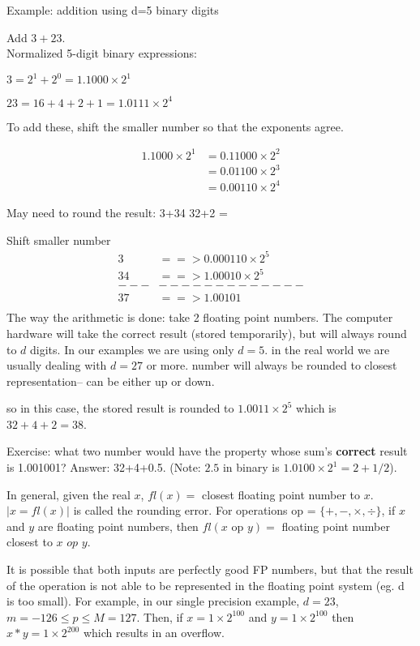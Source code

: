 Example: addition using d=5 binary digits

Add $3+23$.\\ \noi
Normalized 5-digit binary expressions:

$3 = 2^1 + 2^0 = 1.1000 \times 2^1$

$23 = 16 + 4 + 2 + 1 = 1.0111 \times 2^4$

To add these, shift the smaller number so that the exponents agree.

\begin{align}
1.1000 \times 2^1 & = 0.11000 \times 2^2 \\
& = 0.01100 \times 2^3 \\
& = 0.00110 \times 2^4
\end{align}



May need to round the result: 
3+34
32+2 = 

Shift smaller number
\begin{align*}
3 &==> 0.000110 \times 2^5\\
34 &==> 1.00010 \times 2^5\\
---&-------------\\
37 &==> 1.00101  \\
\end{align*}
\noi
The way the arithmetic is done: take 2 floating point numbers. The computer
hardware will take the correct result (stored temporarily), but will always
round to $d$ digits. In our examples we are using only $d=5$. in the real world we are usually dealing with $d=27$ or more. number will always be rounded to closest representation-- can be either up or down. 

so in this case, the stored result is rounded to $1.0011 \times 2^5$ which is $32+4+2 = 38$. 

Exercise: what two number would have the property whose sum's \textbf{correct}
result is 1.001001? Answer: 32+4+0.5. (Note: $2.5$ in binary is $1.0100 \times 2^1 = 2 + 1/2$). 

In general, given the real $x$, $fl(x) = $ closest floating point
number to $x$. $|x = fl(x)|$ is called the rounding error. For
operations op = $\{+,-,\times,\div\}$, if $x$ and $y$ are floating
point numbers, then $fl(x\text{ op }y) =$ floating point number closest to $x$ $op$ $y$. 

It is possible that both inputs are perfectly good FP numbers, but that the
result of the operation is not able to be represented in the floating point
system (eg. d is too small). For example, in our single precision example,
$d=23$, $m = -126 \le p \le M = 127$. Then, if $x = 1 \times 2^{100}$ and $y = 1 \times
2^{100}$ then $x*y = 1\times2^{200}$ which results in an overflow. 

